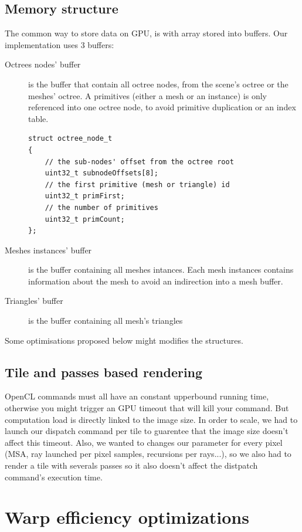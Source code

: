 \documentclass[10pt,twocolumn,a4paper]{article}
\begin{document}
\subsection{Memory structure}
The common way to store data on GPU, is with array stored into buffers.
Our implementation uses 3 buffers:
\begin{description}
    \item[Octrees nodes' buffer] is the buffer that contain all octree nodes,
        from the scene's octree or the meshes' octree. A primitives (either a
        mesh or an instance) is only referenced into one octree node, to avoid
        primitive duplication or an index table.
        \begin{lstlisting}
struct octree_node_t
{
    // the sub-nodes' offset from the octree root
    uint32_t subnodeOffsets[8];
    // the first primitive (mesh or triangle) id
    uint32_t primFirst;
    // the number of primitives
    uint32_t primCount;
};
        \end{lstlisting}
    \item[Meshes instances' buffer] is the buffer containing all meshes intances.
        Each mesh instances contains information about the mesh to avoid an
        indirection into a mesh buffer.
    \item[Triangles' buffer] is the buffer containing all mesh's triangles
\end{description}
Some optimisations proposed below might modifies the structures.

\subsection{Tile and passes based rendering}
OpenCL commands must all have an constant upperbound running time, otherwise
you might trigger an GPU timeout that will kill your command. But computation
load is directly linked to the image size. In order to scale, we had to launch
our dispatch command per tile to guarentee that the image size doesn't affect
this timeout. Also, we wanted to changes our parameter for every pixel (MSA,
ray launched per pixel samples, recursions per rays...), so we also had to
render a tile with severals passes so it also doesn't affect the distpatch
command's execution time.

\section{Warp efficiency optimizations}
\end{document}

